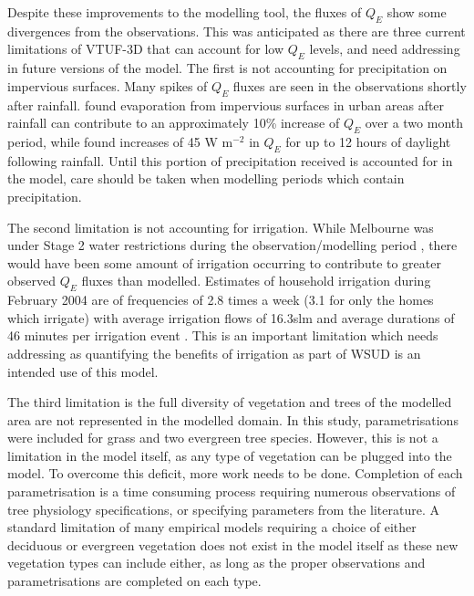 \documentclass[final,3p,times,authoryear]{elsarticle}
\begin{document}
Despite these improvements to the modelling tool, the fluxes of $Q_{E}$ show some divergences from the observations. This was anticipated as there are three current limitations of VTUF-3D that can account for low $Q_{E}$ levels, and need addressing in future versions of the model. The first is not accounting for precipitation on impervious surfaces. Many spikes of $Q_{E}$ fluxes are seen in the observations shortly after rainfall. \cite{Demuzere2014} found evaporation from impervious surfaces in urban areas after rainfall can contribute to an approximately 10\% increase of $Q_{E}$ over a two month period, while \cite{Wouters2013} found increases of 45 W m$^{-2}$ in $Q_{E}$ for up to 12 hours of daylight following rainfall. Until this portion of precipitation received is accounted for in the model, care should be taken when modelling periods which contain precipitation.

The second limitation is not accounting for irrigation. While Melbourne was under Stage 2 water restrictions during the observation/modelling period \citep{MelbourneWater2016a}, there would have been some amount of irrigation occurring to contribute to greater observed $Q_{E}$ fluxes than modelled. Estimates of household irrigation during February 2004 are of frequencies of 2.8 times a week (3.1 for only the homes which irrigate) with average irrigation flows of 16.3slm and average durations of 46 minutes per irrigation event \citep{Roberts2005}. This is an important limitation which needs addressing as quantifying the benefits of irrigation as part of WSUD is an intended use of this model. 

The third limitation is the full diversity of vegetation and trees of the modelled area are not represented in the modelled domain. In this study, parametrisations were included for grass and two evergreen tree species. However, this is not a limitation in the model itself, as any type of vegetation can be plugged into the model. To overcome this deficit, more work needs to be done. Completion of each parametrisation is a time consuming process requiring numerous observations of tree physiology specifications, or specifying parameters from the literature. A standard limitation of many empirical models requiring a choice of either deciduous or evergreen vegetation does not exist in the model itself as these new vegetation types can include either, as long as the proper observations and parametrisations are completed on each type.
\end{document}

